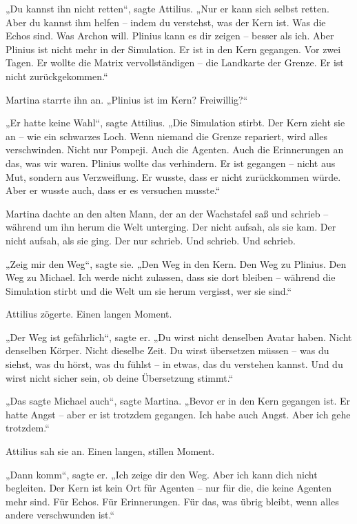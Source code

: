 \documentclass[
]{article}
\begin{document}
„Du kannst ihn nicht retten``, sagte Attilius. „Nur er kann sich selbst retten. Aber du kannst ihm helfen -- indem du verstehst, was der Kern ist. Was die Echos sind. Was Archon will. Plinius kann es dir zeigen -- besser als ich. Aber Plinius ist nicht mehr in der Simulation. Er ist in den Kern gegangen. Vor zwei Tagen. Er wollte die Matrix vervollständigen -- die Landkarte der Grenze. Er ist nicht zurückgekommen.``

Martina starrte ihn an. „Plinius ist im Kern? Freiwillig?{\kern0pt}``

„Er hatte keine Wahl``, sagte Attilius. „Die Simulation stirbt. Der Kern zieht sie an -- wie ein schwarzes Loch. Wenn niemand die Grenze repariert, wird alles verschwinden. Nicht nur Pompeji. Auch die Agenten. Auch die Erinnerungen an das, was wir waren. Plinius wollte das verhindern. Er ist gegangen -- nicht aus Mut, sondern aus Verzweiflung. Er wusste, dass er nicht zurückkommen würde. Aber er wusste auch, dass er es versuchen musste.``

Martina dachte an den alten Mann, der an der Wachstafel saß und schrieb -- während um ihn herum die Welt unterging. Der nicht aufsah, als sie kam. Der nicht aufsah, als sie ging. Der nur schrieb. Und schrieb. Und schrieb.

„Zeig mir den Weg``, sagte sie. „Den Weg in den Kern. Den Weg zu Plinius. Den Weg zu Michael. Ich werde nicht zulassen, dass sie dort bleiben -- während die Simulation stirbt und die Welt um sie herum vergisst, wer sie sind.``

Attilius zögerte. Einen langen Moment.

„Der Weg ist gefährlich``, sagte er. „Du wirst nicht denselben Avatar haben. Nicht denselben Körper. Nicht dieselbe Zeit. Du wirst übersetzen müssen -- was du siehst, was du hörst, was du fühlst -- in etwas, das du verstehen kannst. Und du wirst nicht sicher sein, ob deine Übersetzung stimmt.``

„Das sagte Michael auch``, sagte Martina. „Bevor er in den Kern gegangen ist. Er hatte Angst -- aber er ist trotzdem gegangen. Ich habe auch Angst. Aber ich gehe trotzdem.``

Attilius sah sie an. Einen langen, stillen Moment.

„Dann komm``, sagte er. „Ich zeige dir den Weg. Aber ich kann dich nicht begleiten. Der Kern ist kein Ort für Agenten -- nur für die, die keine Agenten mehr sind. Für Echos. Für Erinnerungen. Für das, was übrig bleibt, wenn alles andere verschwunden ist.``
\end{document}
